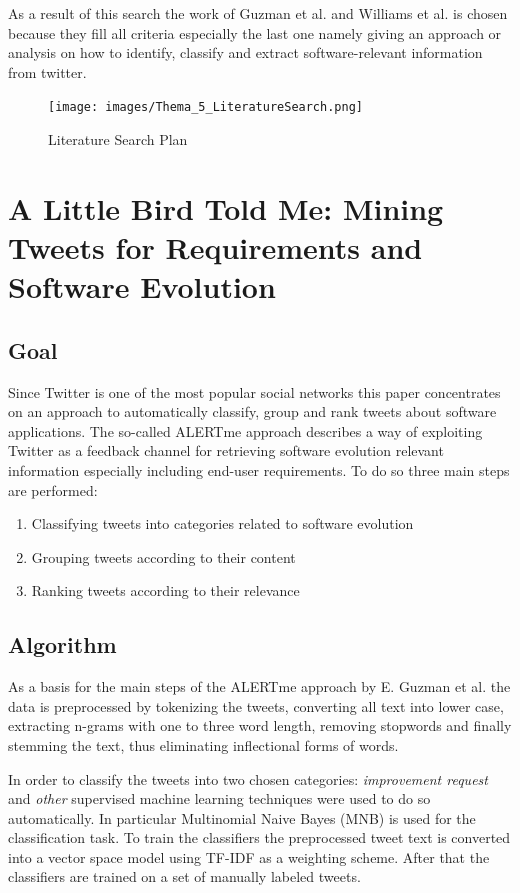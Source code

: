 \documentclass[a4paper,10pt, bibliography=totocnumbered]{scrreprt}
\begin{document}
As a result of this search the work of Guzman et al.\cite{Guzman} and Williams et al.\cite{Williams} is chosen because they fill all criteria especially the last one namely giving an approach or analysis on how to identify, classify and extract software-relevant information from twitter. 

\begin{figure}
\centering
\texttt{[image: images/Thema\_5\_LiteratureSearch.png]}
\caption{Literature Search Plan}
\label{fig:literatureSearchPlan}
\end{figure}



\chapter{A Little Bird Told Me: Mining Tweets for Requirements and Software Evolution}
\label{chap:3}

\section{Goal}

Since Twitter is one of the most popular social networks this paper concentrates on an approach to automatically classify, group and rank tweets about software applications. The so-called ALERTme approach describes a way of exploiting Twitter as a feedback channel for retrieving software evolution relevant information especially including end-user requirements. To do so three main steps are performed:
\begin{enumerate}
    \item Classifying tweets into categories related to software evolution
    \item Grouping tweets according to their content
    \item Ranking tweets according to their relevance
\end{enumerate}

\section{Algorithm}
As a basis for the main steps of the ALERTme approach by E. Guzman et al. \cite{Guzman} the data is preprocessed by tokenizing the tweets, converting all text into lower case, extracting n-grams with one to three word length, removing stopwords and finally stemming the text, thus eliminating inflectional forms of words. 

In order to classify the tweets into two chosen categories: \textit{improvement request} and \textit{other} supervised machine learning techniques were used to do so automatically. In particular Multinomial Naive Bayes (MNB) is used for the classification task. To train the classifiers the preprocessed tweet text is converted into a vector space model using TF-IDF as a weighting scheme. After that the classifiers are trained on a set of manually labeled tweets.
\end{document}
